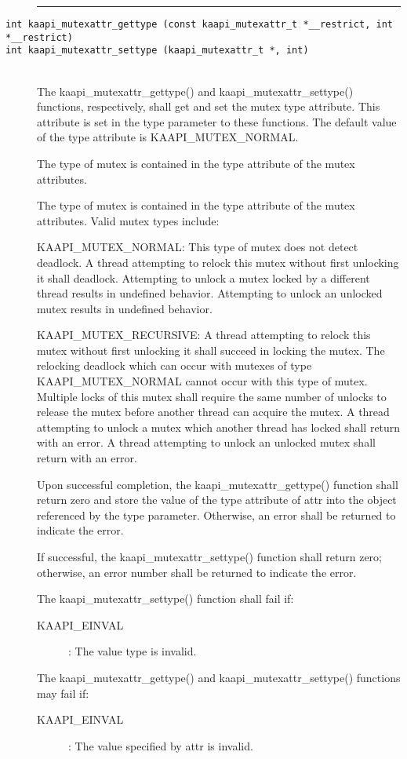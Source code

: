 \begin{description}
\vspace*{3ex} \hrule width 4cm
\item [\texttt{int kaapi\_mutexattr\_gettype (const kaapi\_mutexattr\_t
    *\_\_restrict, int *\_\_restrict)}]
\item [\texttt{int kaapi\_mutexattr\_settype (kaapi\_mutexattr\_t *, int)}]~\\

The kaapi\_mutexattr\_gettype() and kaapi\_mutexattr\_settype() functions,
respectively, shall get and set the mutex type attribute. This attribute is
set in the type parameter to these functions. The default value of the type
attribute is KAAPI\_MUTEX\_NORMAL.

The type of mutex is contained in the type attribute of the mutex attributes.

The type of mutex is contained in the type attribute of the mutex
attributes. Valid mutex types include:

KAAPI\_MUTEX\_NORMAL: This type of mutex does not detect deadlock. A thread
attempting to relock this mutex without first unlocking it shall
deadlock. Attempting to unlock a mutex locked by a different thread results in
undefined behavior. Attempting to unlock an unlocked mutex results in
undefined behavior.

KAAPI\_MUTEX\_RECURSIVE: A thread attempting to relock this mutex without
first unlocking it shall succeed in locking the mutex. The relocking deadlock
which can occur with mutexes of type KAAPI\_MUTEX\_NORMAL cannot occur with
this type of mutex. Multiple locks of this mutex shall require the same number
of unlocks to release the mutex before another thread can acquire the mutex. A
thread attempting to unlock a mutex which another thread has locked shall
return with an error. A thread attempting to unlock an unlocked mutex shall
return with an error.

Upon successful completion, the kaapi\_mutexattr\_gettype() function shall
return zero and store the value of the type attribute of attr into the object
referenced by the type parameter. Otherwise, an error shall be returned to
indicate the error.

If successful, the kaapi\_mutexattr\_settype() function shall return zero;
otherwise, an error number shall be returned to indicate the error.

The kaapi\_mutexattr\_settype() function shall fail if:

\begin{description}
\item [KAAPI\_EINVAL]: The value type is invalid.
\end{description}

The kaapi\_mutexattr\_gettype() and kaapi\_mutexattr\_settype() functions may
fail if:

\begin{description}
\item [KAAPI\_EINVAL]: The value specified by attr is invalid.
\end{description}
\end{description}

